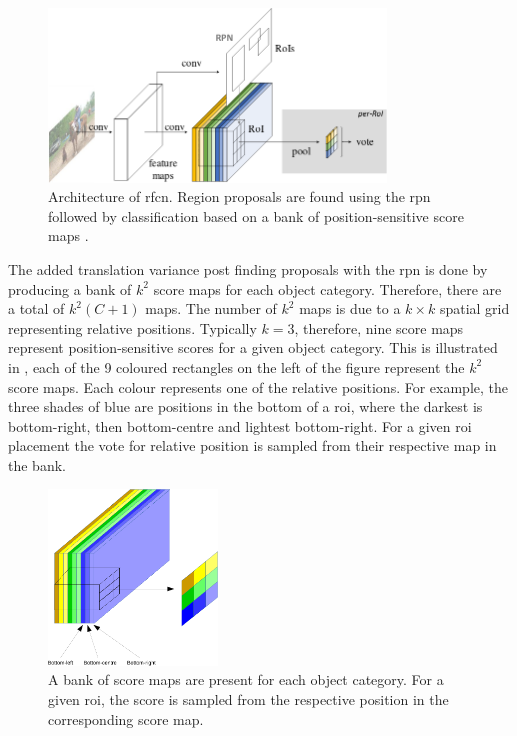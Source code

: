 \begin{figure}[H]
  \centering
    \includegraphics[width=0.8\textwidth]{Figs/Techanal/rfcnarchi.png}
      \caption{Architecture of \gls{rfcn}. Region proposals are found using the \gls{rpn} followed by classification based on a bank of position-sensitive score maps \cite{rfcn}.}
    \label{fig:rfcnarch}
\end{figure}

The added translation variance post finding proposals with the \gls{rpn} is done by producing a bank of $k^2$ score maps for each object category. Therefore, there are a total of $k^2(C + 1)$ maps. The number of $k^2$ maps is due to a $k \times k$ spatial grid representing relative positions. Typically $k = 3$, therefore, nine score maps represent position-sensitive scores for a given object category. This is illustrated in , each of the 9 coloured rectangles on the left of the figure represent the $k^2$ score maps. Each colour represents one of the relative positions. For example, the three shades of blue are positions in the bottom of a \gls{roi}, where the darkest is bottom-right, then bottom-centre and lightest bottom-right. For a given \gls{roi} placement the vote for relative position is sampled from their respective map in the bank.

\begin{figure}[H]
  \centering
    \includegraphics[width=0.4\textwidth]{Figs/Techanal/scoremaps1-crop.pdf}
     \caption{A bank of score maps are present for each object category. For a given \gls{roi}, the score is sampled from the respective position in the corresponding score map.}
    \label{fig:scoremaps}
\end{figure}

